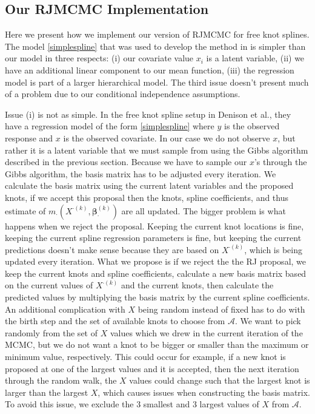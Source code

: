 \documentclass[11pt]{article}\usepackage[]{graphicx}\usepackage[]{color}
\begin{document}
\subsection{Our RJMCMC Implementation}

Here we present how we implement our version of RJMCMC for free knot splines. The model \eqref{simplespline} that was used to develop the method in \cite{denison} is simpler than our model in three respects: (i) our covariate value $x_i$ is a latent variable, (ii) we have an additional linear component to our mean function, (iii) the regression model is part of a larger hierarchical model. The third issue doesn't present much of a problem due to our conditional independence assumptions. 

Issue (i) is not as simple. In the free knot spline setup in Denison et al., they have a regression model of the form \eqref{simplespline} where $y$ is the observed response and $x$ is the observed covariate. In our case we do not observe $x$, but rather it is a latent variable that we must sample from using the Gibbs algorithm described in the previous section. Because we have to sample our $x$'s through the Gibbs algorithm, the basis matrix has to be adjusted every iteration. We calculate the basis matrix using the current latent variables and  the proposed knots, if we accept this proposal then the knots, spline coefficients, and thus estimate of $m_{\cdot}(X^{\cdot (k)},\boldsymbol{\beta}_{\cdot}^{(k)})$ are all updated. The bigger problem is what happens when we reject the proposal. Keeping the current knot locations is fine, keeping the current spline regression parameters is fine, but keeping the current predictions doesn't make sense because they are based on $X^{\cdot (k)}$, which is being updated every iteration. What we propose is if we reject the the RJ proposal, we keep the current knots and spline coefficients, calculate a new basis matrix based on the current values of $X^{\cdot (k)}$ and the current knots, then calculate the predicted values by multiplying the basis matrix by the current spline coefficients. An additional complication with $X$ being random instead of fixed has to do with the birth step and the set of available knots to choose from $\mathcal{A}$. We want to pick randomly from the set of $X$ values which we drew in the current iteration of the MCMC, but we do not want a knot to be bigger or smaller than the maximum or minimum value, respectively. This could occur for example, if a new knot is proposed at one of the largest values and it is accepted, then the next iteration through the random walk, the $X$ values could change such that the largest knot is larger than the largest $X$, which causes issues when constructing the basis matrix. To avoid this issue, we exclude the 3 smallest and 3 largest values of $X$ from $\mathcal{A}$.
\end{document}
